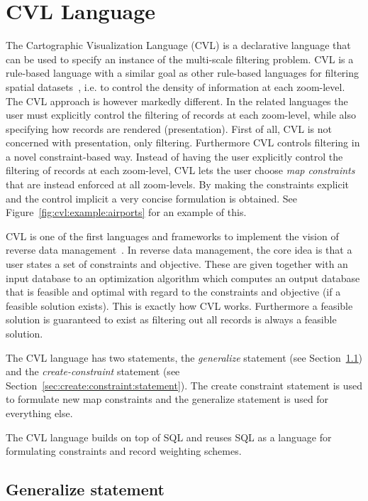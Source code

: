 \section{CVL Language}
\label{sec:cvl:language}
The Cartographic Visualization Language (CVL) is a declarative language that can be used to specify an instance of the multi-scale filtering problem. CVL is a rule-based language with a similar goal as other rule-based languages for filtering spatial datasets~\cite{sld,mapnik}, i.e. to control the density of information at each zoom-level. The CVL approach is however markedly different. In the related languages the user must explicitly control the filtering of records at each zoom-level, while also specifying how records are rendered (presentation). First of all, CVL is not concerned with presentation, only filtering. Furthermore CVL controls filtering in a novel constraint-based way. Instead of having the user explicitly control the filtering of records at each zoom-level, CVL lets the user choose \emph{map constraints} that are instead enforced at all zoom-levels. By making the constraints explicit and the control implicit a very concise formulation is obtained. See Figure~\ref{fig:cvl:example:airports} for an example of this.

CVL is one of the first languages and frameworks to implement the vision of reverse data management~\cite{meliou2011reverse}. In reverse data management, the core idea is that a user states a set of constraints and objective. These are given together with an input database to an optimization algorithm which computes an output database that is feasible and optimal with regard to the constraints and objective (if a feasible solution exists). This is exactly how CVL works. Furthermore a feasible solution is guaranteed to exist as filtering out all records is always a feasible solution.

The CVL language has two statements, the \emph{generalize} statement (see Section~\ref{sec:generalize:statement}) and the \emph{create-constraint} statement (see Section~\ref{sec:create:constraint:statement}). The create constraint statement is used to formulate new map constraints and the generalize statement is used for everything else. 

The CVL language builds on top of SQL and reuses SQL as a language for formulating constraints and record weighting schemes.

\subsection{Generalize statement}
\label{sec:generalize:statement}

